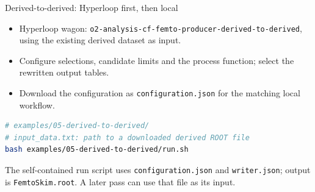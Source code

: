 \begin{frame}[fragile]{Derived-to-derived: Hyperloop first, then local}
 \begin{itemize}
 \item Hyperloop wagon: \texttt{o2-analysis-cf-femto-producer-derived-to-derived}, using the existing derived dataset as input.
 \item Configure selections, candidate limits and the process function; select the rewritten output tables.
 \item Download the configuration as \texttt{configuration.json} for the matching local workflow.
 \end{itemize}
 \begin{lstlisting}[language=bash]
# examples/05-derived-to-derived/
# input_data.txt: path to a downloaded derived ROOT file
bash examples/05-derived-to-derived/run.sh
 \end{lstlisting}
 \small The self-contained run script uses \texttt{configuration.json} and \texttt{writer.json}; output is \texttt{FemtoSkim.root}. A later pass can use that file as its input.
\end{frame}

